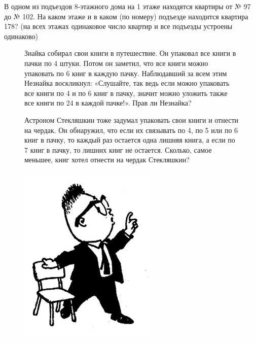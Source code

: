 \begin{thm}
    В одном из подъездов 8-этажного дома на 1 этаже находятся квартиры от № 97 до № 102.
На каком этаже и в каком (по номеру) подъезде находится квартира 178? (на всех этажах одинаковое
число квартир и все подъезды устроены одинаково)
\end{thm}

\setlength{\intextsep}{0pt}
\begin{figure}[h]
\begin{minipage}[h]{0.84\linewidth}\setlength{\parindent}{1.5em}
\begin{thm}
Знайка собирал свои книги в путешествие. Он упаковал все книги в
пачки по 4 штуки. Потом он заметил, что все книги можно упаковать по 6 книг в
каждую пачку. Наблюдавший за всем этим Незнайка воскликнул: «Слушайте, так
ведь если можно упаковать все книги по 4 и по 6 книг в пачку, значит можно
уложить также все книги по 24 в каждой пачке!». Прав ли Незнайка?
\end{thm}

\begin{thm}
    Астроном Стекляшкин тоже задумал упаковать свои книги и отнести на
чердак. Он обнаружил, что если их связывать по 4, по 5 или по 6 книг в пачку, то
каждый раз остается одна лишняя книга, а если по 7 книг в пачку, то лишних книг
не остается. Сколько, самое меньшее, книг хотел отнести на чердак Стекляшкин?
\end{thm}

\end{minipage}
\begin{minipage}[h]{0.15\linewidth}
    \includegraphics[width=0.9\columnwidth]{./img/znaika}
\end{minipage}
\end{figure}
\setlength{\intextsep}{12pt}

